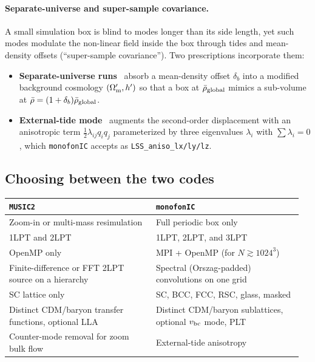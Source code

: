 \documentclass[12pt]{article}
\begin{document}
\paragraph{Separate-universe and super-sample covariance.}
A small simulation box is blind to modes longer than its side length,
yet such modes modulate the non-linear field inside the box through
tides and mean-density offsets (``super-sample covariance'').  Two
prescriptions incorporate them:
%
\begin{itemize}
  \item \textbf{Separate-universe runs}~\citep{Sirko2005,Wagner2015}
        absorb a mean-density offset $\delta_b$ into a modified
        background cosmology $(\Omega_{\rm m}', h')$ so that a box at
        $\bar\rho_{\rm global}$ mimics a sub-volume at
        $\bar\rho = (1+\delta_b)\bar\rho_{\rm global}$.
  \item \textbf{External-tide mode}~\citep{Stuecker2021} augments the
        second-order displacement with an anisotropic term
        $\tfrac{1}{2}\lambda_{ij}q_i q_j$ parameterized by three
        eigenvalues $\lambda_i$ with $\sum \lambda_i = 0$, which
        \texttt{monofonIC} accepts as \texttt{LSS\_aniso\_lx/ly/lz}.
\end{itemize}

\subsection{Choosing between the two codes}
\label{sec:implementations_choice}

\begin{center}
\small
\begin{tabular}{@{}p{0.48\linewidth}p{0.48\linewidth}@{}}
\toprule
\textbf{\texttt{MUSIC2}} &
\textbf{\texttt{monofonIC}} \\[1pt]
\midrule
Zoom-in or multi-mass resimulation & Full periodic box only \\
1LPT and 2LPT & 1LPT, 2LPT, and 3LPT \\
OpenMP only & MPI + OpenMP (for $N \gtrsim 1024^3$) \\
Finite-difference or FFT 2LPT source on a hierarchy &
Spectral (Orszag-padded) convolutions on one grid \\
SC lattice only &
SC, BCC, FCC, RSC, glass, masked \\
Distinct CDM/baryon transfer functions, optional LLA &
Distinct CDM/baryon sublattices, optional $v_{\rm bc}$ mode, PLT \\
Counter-mode removal for zoom bulk flow & External-tide anisotropy \\
\bottomrule
\end{tabular}
\end{center}
\end{document}
